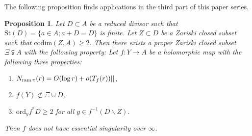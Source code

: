 \documentclass[11pt,english]{smfart}
\theoremstyle{plain}
\newtheorem{proposition}[thm]{Proposition}
\theoremstyle{definition}
\theoremstyle{remark}
\numberwithin{equation}{section}
\theoremstyle{plain}
\newcommand{\ram}{{\rm ram}\,}
\begin{document}
	
	
	
	
	
	
	
	
	
	
	
	
	
	
	
	
	
	
	
	
	
	
	
	
	
	
	
	
The following proposition finds applications in the third part of this paper series.
	
	\begin{proposition}\label{prop:20230405}
		Let $D\subset A$ be a reduced divisor such that $\mathrm{St}(D)=\{ a\in A; a+D=D\}$ is finite.
		Let $Z\subset D$ be a Zariski closed subset such that $\mathrm{codim}(Z,A)\geq 2$.
		Then there exists a proper Zariski closed subset $\Xi\subsetneqq A$ with the following property:
		Let $f:Y\to A$ be a holomorphic map with the following three properties:
		\begin{enumerate}[label=(\alph*)]
			\item  
			$N_{\ram\pi}(r)=O(\log r)+o(T_f(r))||$, 
			\item  
			$f(Y)\not\subset \Xi\cup D$,
			\item
			$\mathrm{ord}_yf^*D\geq 2$ for all $y\in f^{-1}(D\backslash Z)$.	\end{enumerate}
		Then $f$ does not have essential singularity over $\infty$.
	\end{proposition}
	
\end{document}
